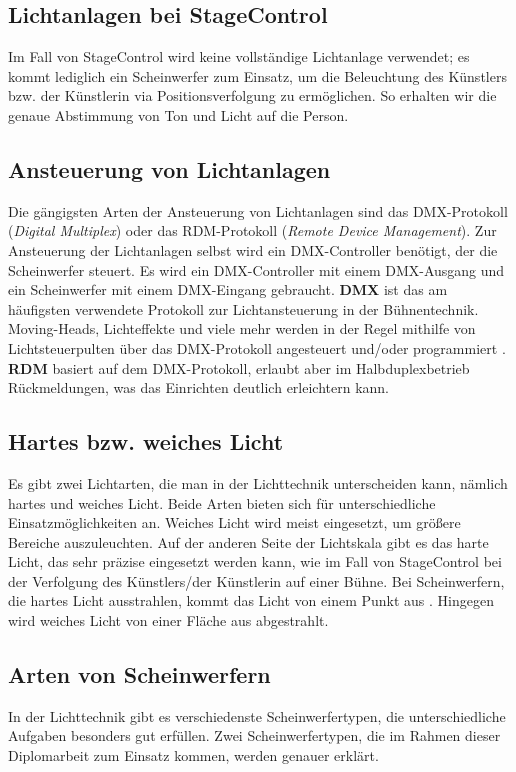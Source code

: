 \subsection{Lichtanlagen bei StageControl}
Im Fall von StageControl wird keine vollständige Lichtanlage verwendet; es kommt lediglich ein Scheinwerfer zum Einsatz, um die Beleuchtung des Künstlers bzw. der Künstlerin via Positionsverfolgung zu ermöglichen. So erhalten wir die genaue Abstimmung von Ton und Licht auf die Person.

\subsection{Ansteuerung von Lichtanlagen}

Die gängigsten Arten der Ansteuerung von Lichtanlagen sind das DMX-Protokoll (\emph{Digital Multiplex}) oder das RDM-Protokoll (\emph{Remote Device Management}). Zur Ansteuerung der Lichtanlagen selbst wird ein DMX-Controller benötigt, der die Scheinwerfer steuert. Es wird ein DMX-Controller mit einem DMX-Ausgang und ein Scheinwerfer mit einem DMX-Eingang gebraucht.
\textbf{DMX} ist das am häufigsten verwendete Protokoll zur Lichtansteuerung in der Bühnentechnik. Moving-Heads, Lichteffekte und viele mehr werden in der Regel mithilfe von Lichtsteuerpulten über das DMX-Protokoll angesteuert und/oder programmiert \textcite{LichtanlageRDMDMX}.
\textbf{RDM} basiert auf dem DMX-Protokoll, erlaubt aber im Halbduplexbetrieb Rückmeldungen, was das Einrichten deutlich erleichtern kann.\\


\subsection{Hartes bzw. weiches Licht}
Es gibt zwei Lichtarten, die man in der Lichttechnik unterscheiden kann, nämlich hartes und weiches Licht. Beide Arten bieten sich für unterschiedliche Einsatzmöglichkeiten an. Weiches Licht wird meist eingesetzt, um größere Bereiche auszuleuchten. Auf der anderen Seite der Lichtskala gibt es das harte Licht, das sehr präzise eingesetzt werden kann, wie im Fall von StageControl bei der Verfolgung des Künstlers/der Künstlerin auf einer Bühne. Bei Scheinwerfern, die hartes Licht ausstrahlen, kommt das Licht von einem Punkt aus \textcite{HartesWeichesLicht}. Hingegen wird weiches Licht von einer Fläche aus abgestrahlt.\\


\subsection{Arten von Scheinwerfern}
In der Lichttechnik gibt es verschiedenste Scheinwerfertypen, die unterschiedliche Aufgaben besonders gut erfüllen. Zwei Scheinwerfertypen, die im Rahmen dieser Diplomarbeit zum Einsatz kommen, werden genauer erklärt.

